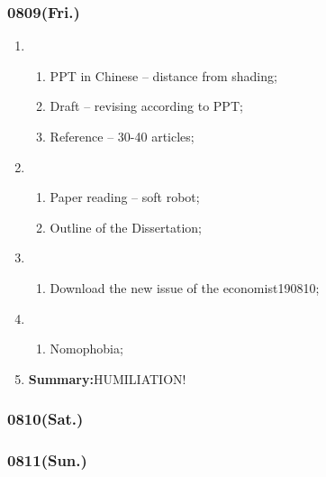 \subsubsection{0809(Fri.)}
\begin{enumerate}
	\item \ncquaone
	\begin{enumerate}[(1)]
		\item PPT in Chinese -- distance from shading;\rightdone
		\item Draft -- revising according to PPT;\rightundoneBlack
		\item Reference -- 30-40 articles;\rightundoneBlack
	\end{enumerate}
	
	\item \ncquatwo	
	\begin{enumerate}[(1)]
		\item Paper reading -- soft robot;\rightundoneBlack
		\item Outline of the Dissertation;\rightundoneBlack 
	\end{enumerate}
	
	\item \ncquathree
	\begin{enumerate}[(1)]
		\item Download the new issue of the economist190810;\rightdone
	\end{enumerate}
	
	\item \ncquafour	
	\begin{enumerate}[(1)]
		\item Nomophobia;\rightundoneBlack
	\end{enumerate}
	\item \textbf{Summary:}HUMILIATION! 
\end{enumerate}
\subsubsection{0810(Sat.)}
\subsubsection{0811(Sun.)}
